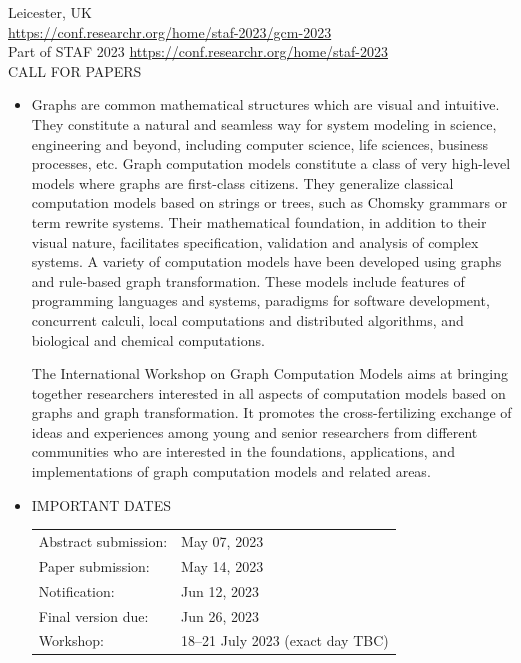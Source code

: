 \documentclass[prodmode,acmtecs]{acmsmall} %
\begin{document}
  Leicester, UK\\ 
  \href{https://conf.researchr.org/home/staf-2023/gcm-2023}{https://conf.researchr.org/home/staf-2023/gcm-2023}\\ 
  Part of STAF 2023 \href{https://conf.researchr.org/home/staf-2023}{https://conf.researchr.org/home/staf-2023}\\ 
CALL FOR PAPERS 

\begin{itemize}\item  Graphs are common mathematical structures which are visual and intuitive. They constitute a natural and seamless way for system modeling in science, engineering and beyond, including computer science, life sciences, business processes, etc. Graph computation models constitute a class of very high-level models where graphs are first-class citizens. They generalize classical computation models based on strings or trees, such as Chomsky grammars or term rewrite systems. Their mathematical foundation, in addition to their visual nature, facilitates specification, validation and analysis of complex systems. A variety of computation models have been developed using graphs and rule-based graph transformation. These models include features of programming languages and systems, paradigms for software development, concurrent calculi, local computations and distributed algorithms, and biological and chemical computations. 
 
  The International Workshop on Graph Computation Models aims at bringing together researchers interested in all aspects of computation models based on graphs and graph transformation. It promotes the cross-fertilizing exchange of ideas and experiences among young and senior researchers from different communities who are interested in the foundations, applications, and implementations of graph computation models and related areas. 
 
\item  IMPORTANT DATES 
 
\begin{tabulary}{\linewidth}{LL}Abstract submission:  & May 07, 2023 \\
Paper submission:  & May 14, 2023 \\
Notification:  & Jun 12, 2023 \\
Final version due:  & Jun 26, 2023 \\
Workshop:  & 18–21 July 2023 (exact day TBC) \\
\end{tabulary}
 

\end{itemize}
\end{document}
